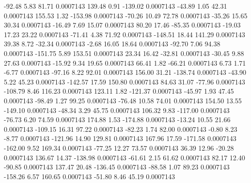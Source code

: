       -92.48        5.83       81.71     0.0007143
      139.48        0.91     -139.02     0.0007143
      -43.89        1.05       42.31     0.0007143
      155.53        1.32     -153.98     0.0007143
      -70.26       10.49       72.78     0.0007143
      -35.26       15.65       30.34     0.0007143
      -16.49        7.69       15.07     0.0007143
       80.20       17.46      -85.35     0.0007143
      -19.03       17.23       23.22     0.0007143
      -71.41        4.38       71.92     0.0007143
     -148.51       18.44      141.29     0.0007143
       39.38        8.72      -32.34     0.0007143
       -2.68       16.05       18.64     0.0007143
      -92.70        7.06       94.38     0.0007143
     -151.75        5.89      153.51     0.0007143
       23.34       16.42      -32.81     0.0007143
      -30.45        9.88       27.63     0.0007143
      -15.92        9.34       19.65     0.0007143
       66.41        1.82      -66.21     0.0007143
        6.73        1.71       -6.77     0.0007143
      -97.16        8.22       92.01     0.0007143
      156.00       31.21     -138.74     0.0007143
      -43.90        5.22       45.23     0.0007143
     -142.57       17.59      150.80     0.0007143
       84.63       31.07      -77.96     0.0007143
     -108.79        8.46      116.23     0.0007143
      123.11        1.82     -121.37     0.0007143
      -45.97        1.93       47.45     0.0007143
      -98.49        1.27       99.25     0.0007143
      -76.48       10.58       74.01     0.0007143
      154.50       13.55     -149.10     0.0007143
      -48.34        3.29       45.75     0.0007143
      106.32        9.83     -117.00     0.0007143
      -76.73        6.20       74.59     0.0007143
      174.88        1.53     -174.88     0.0007143
      -13.24       10.55       21.66     0.0007143
     -109.15       16.31       97.22     0.0007143
      -82.23        1.74       82.00     0.0007143
       -0.80        8.23       -8.77     0.0007143
     -121.96       14.90      129.81     0.0007143
      167.96       17.59     -171.58     0.0007143
     -162.00        9.52      169.34     0.0007143
      -77.25       12.27       73.57     0.0007143
       36.39       12.96      -20.28     0.0007143
      136.67       14.37     -138.98     0.0007143
      -61.61        2.15       61.62     0.0007143
       82.17       12.40      -90.85     0.0007143
      137.47       20.48     -136.45     0.0007143
      -88.58        1.07       89.23     0.0007143
     -158.26        6.57      160.65     0.0007143
      -51.80        8.46       45.19     0.0007143
